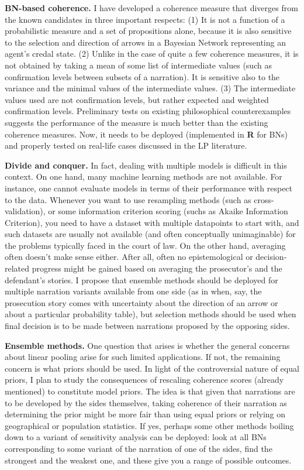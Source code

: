 \documentclass[11pt,dvipsnames,enabledeprecatedfontcommands]{scrartcl}
\begin{document}
\noindent
 \textbf{BN-based coherence.} I have developed a coherence measure that
diverges from the known candidates in three important respects: (1) It
is not a function of a probabilistic measure and a set of propositions
alone, because it is also sensitive to the selection and direction of
arrows in a Bayesian Network representing an agent's credal state. (2)
Unlike in the case of quite a few coherence measures, it is not obtained
by taking a mean of some list of intermediate values (such as
confirmation levels between subsets of a narration). It is sensitive
also to the variance and the minimal values of the intermediate values.
(3) The intermediate values used are not confirmation levels, but rather
expected and weighted confirmation levels. Preliminary tests on existing
philosophical counterexamples suggests the performance of the measure is
much better than the existing coherence measures. Now, it needs to be
deployed (implemented in \textbf{\textsf{R}} for BNs) and properly
tested on real-life cases discussed in the LP literature.

\noindent
 \textbf{Divide and conquer.} In fact, dealing with multiple models is
difficult in this context. On one hand, many machine learning methods
are not available. For instance, one cannot evaluate models in terms of
their performance with respect to the data. Whenever you want to use
resampling methods (such as cross-validation), or some information
criterion scoring (suchs as Akaike Information Criterion), you need to
have a dataset with multiple datapoints to start with, and such datasets
are usually not available (and often conceptually unimaginable) for the
problems typically faced in the court of law. On the other hand,
averaging often doesn't make sense either. After all, often no
epistemological or decision-related progress might be gained based on
averaging the prosecutor's and the defendant's stories. I propose that
ensemble methods should be deployed for multiple narration variants
available from one side (as in when, say, the prosecution story comes
with uncertainty about the direction of an arrow or about a particular
probability table), but selection methods should be used when final
decision is to be made between narrations proposed by the opposing
sides.

\noindent
\textbf{Ensemble methods.} One question that arises is whether the
general concerns about linear pooling arise for such limited
applications. If not, the remaining concern is what priors should be
used. In light of the controversial nature of equal priors, I plan to
study the consequences of rescaling coherence scores (already mentioned)
to constitute model priors. The idea is that given that narrations are
to be developed by the sides themselves, taking coherence of their
narration as determining the prior might be more fair than using equal
priors or relying on geographical or population statistics. If yes,
perhaps some other methods boiling down to a variant of sensitivity
analysis can be deployed: look at all BNs corresponding to some variant
of the narration of one of the sides, find the strongest and the weakest
one, and these give you a range of possible outcomes.
\end{document}
